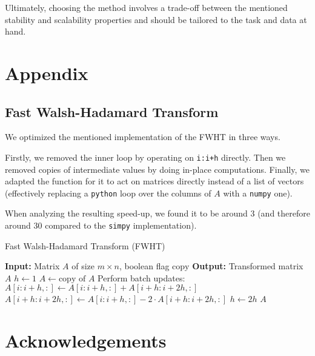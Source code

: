 \documentclass[a4paper, 12pt,oneside]{article}
\begin{document}
Ultimately, choosing the method involves a trade-off between the mentioned stability and scalability properties and should be tailored to the task and data at hand.

\newpage
\section*{Appendix}
\subsection*{Fast Walsh-Hadamard Transform}\label{apx:FWHT}
We optimized the mentioned implementation of the FWHT in three ways.

Firstly, we removed the inner loop by operating on \texttt{i:i+h} directly. Then we removed copies of intermediate values by doing in-place computations. Finally, we adapted the function for it to act on matrices directly instead of a list of vectors (effectively replacing a \texttt{python} loop over the columns of $A$ with a \texttt{numpy} one).

When analyzing the resulting speed-up, we found it to be around 3 (and therefore around 30 compared to the \texttt{simpy} implementation). 
\begin{algorithm}
    \caption{Fast Walsh-Hadamard Transform (FWHT)}
    \begin{algorithmic}[1]
        \State \textbf{Input:} Matrix $A$ of size $m \times n$, boolean flag $\text{copy}$
        \State \textbf{Output:} Transformed matrix $A$
        \State $h \gets 1$
            \State $A \gets \text{copy of } A$
        \EndIf
                \State Perform batch updates:
                \Statex \hspace{\algorithmicindent} $A[i:i+h, :] \gets A[i:i+h, :] + A[i+h:i+2h, :]$
                \Statex \hspace{\algorithmicindent} $A[i+h:i+2h, :] \gets A[i:i+h, :] - 2 \cdot A[i+h:i+2h, :]$
            \EndFor
            \State $h \gets 2h$
        \EndWhile
            \State \Return $A$
        \EndIf
    \end{algorithmic}
\end{algorithm}

	
	\section*{Acknowledgements}
\end{document}
